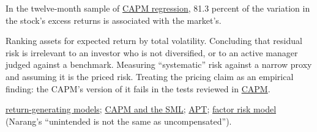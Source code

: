 \begin{qfmechanism}
In the twelve-month sample of \hyperref[meth:capm-regression]{CAPM regression}, 81.3 percent of the variation in the stock's excess returns is associated with the market's.

 Ranking assets for expected return by total volatility. Concluding that residual risk is irrelevant to an investor who is not diversified, or to an active manager judged against a benchmark. Measuring ``systematic'' risk against a narrow proxy and assuming it is the priced risk. Treating the pricing claim as an empirical finding: the CAPM's version of it fails in the tests reviewed in \hyperref[mod:capm-sml]{CAPM}.

 \hyperref[mod:return-generating-models]{return-generating models}; \hyperref[mod:capm-sml]{CAPM and the SML}; \hyperref[mod:multifactor-apt]{APT}; \hyperref[mod:factor-risk-model]{factor risk model} (Narang's ``unintended is not the same as uncompensated'').

\end{qfmechanism}

